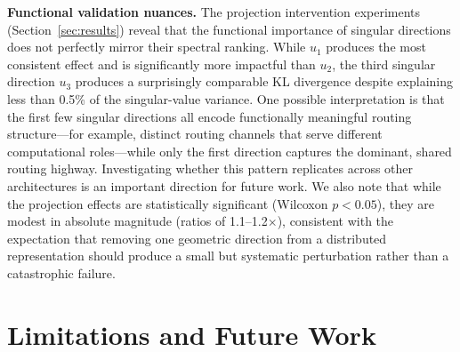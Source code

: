 \documentclass[11pt,a4paper]{article}
\theoremstyle{definition}
\theoremstyle{plain}
\begin{document}
\textbf{Functional validation nuances.} The projection intervention experiments (Section~\ref{sec:results}) reveal that the functional importance of singular directions does not perfectly mirror their spectral ranking. While $u_1$ produces the most consistent effect and is significantly more impactful than $u_2$, the third singular direction $u_3$ produces a surprisingly comparable KL divergence despite explaining less than 0.5\% of the singular-value variance. One possible interpretation is that the first few singular directions all encode functionally meaningful routing structure---for example, distinct routing channels that serve different computational roles---while only the first direction captures the dominant, shared routing highway. Investigating whether this pattern replicates across other architectures is an important direction for future work. We also note that while the projection effects are statistically significant (Wilcoxon $p < 0.05$), they are modest in absolute magnitude (ratios of 1.1--1.2$\times$), consistent with the expectation that removing one geometric direction from a distributed representation should produce a small but systematic perturbation rather than a catastrophic failure.

\section{Limitations and Future Work}
\label{sec:limitations}
\end{document}
